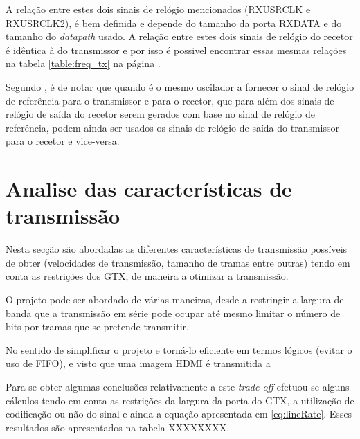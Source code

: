 A relação entre estes dois sinais de relógio mencionados (RXUSRCLK e RXUSRCLK2), é bem definida e depende do tamanho da porta RXDATA e do tamanho do \textit{datapath} usado.  A relação entre estes dois sinais de relógio do recetor é idêntica à do transmissor e por isso é possivel encontrar essas mesmas relações na tabela \ref{table:freq_tx} na página \pageref{table:freq_tx}.

Segundo \cite{R011}, é de notar que quando é o mesmo oscilador a fornecer o sinal de relógio de referência para o transmissor e para o recetor, que para além dos sinais de relógio de saída do recetor serem gerados com base no sinal de relógio de referência, podem ainda ser usados os sinais de relógio de saída do transmissor para o recetor e vice-versa.

\section{Analise das características de transmissão}

Nesta secção são abordadas as diferentes características de transmissão possíveis de obter (velocidades de transmissão, tamanho de tramas entre outras) tendo em conta as restrições dos GTX, de maneira a otimizar a transmissão.

O projeto pode ser abordado de várias maneiras, desde a restringir a largura de banda que a transmissão em série pode ocupar até mesmo limitar o número de bits por tramas que se pretende transmitir.

No sentido de simplificar o projeto e torná-lo eficiente em termos lógicos (evitar o uso de FIFO), e visto que uma imagem HDMI é transmitida a  


Para se obter algumas conclusões relativamente a este \textit{trade-off} efetuou-se alguns cálculos tendo em conta as restrições da largura da porta do GTX, a utilização de codificação ou não do sinal e ainda a equação apresentada em \ref{eq:lineRate}. Esses resultados são apresentados na tabela XXXXXXXX.




	
	
	
	
	
	
	
	

